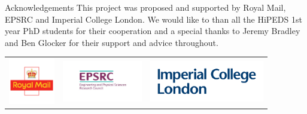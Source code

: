 \documentclass{beamer}
\begin{document}
\begin{frame}{Acknowledgements}
This project was proposed and supported by Royal Mail, EPSRC and Imperial College London. We would like to than all the HiPEDS 1st year PhD students for their cooperation and a special thanks to Jeremy Bradley and Ben Glocker for their support and advice throughout.\\
	\begin{tabular}{ccc}
	\includegraphics[width=2cm]{Figures/royalmail} &
	\includegraphics[width=3.5cm]{Figures/epsrc} &
	\includegraphics[width=5cm]{Figures/imperial}
\end{tabular}
\end{frame}

\end{document}
